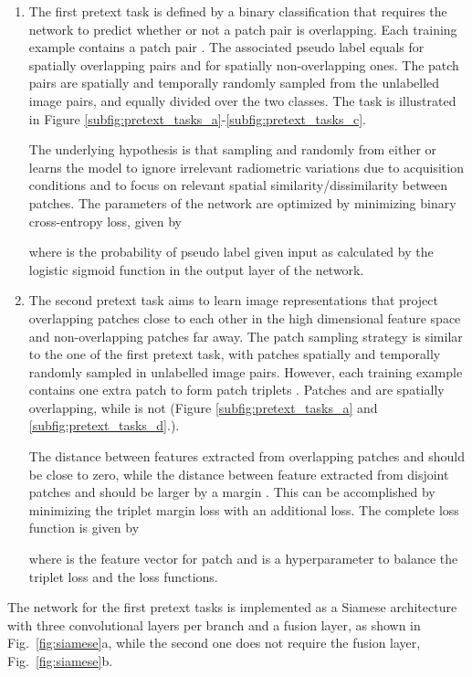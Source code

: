 \documentclass[runningheads]{llncs}
\begin{document}
\begin{enumerate}
\item The first pretext task is defined by a binary classification that requires the network to predict whether or not a patch pair is overlapping. Each training example  contains a patch pair . The associated pseudo label equals  for spatially overlapping pairs and  for spatially non-overlapping ones. The patch pairs are spatially and temporally randomly sampled from the unlabelled image pairs, and equally divided over the two classes. The task is illustrated in Figure \ref{subfig:pretext_tasks_a}-\ref{subfig:pretext_tasks_c}.

The underlying hypothesis is that sampling  and  randomly from either  or  learns the model to ignore irrelevant radiometric variations due to acquisition conditions and to focus on relevant spatial similarity/dissimilarity between patches. 
The parameters of the network are optimized by minimizing binary cross-entropy loss, given by 

where  is the probability of pseudo label  given input  as calculated by the logistic sigmoid function in the output layer of the network. 

\item The second pretext task aims to learn image representations that project overlapping patches close to each other in the high dimensional feature space and non-overlapping patches far away. The patch sampling strategy is similar to the one of the first pretext task, with patches spatially and temporally randomly sampled in unlabelled image pairs. However, each training example  contains one extra patch to form patch triplets . Patches  and  are spatially overlapping, while  is not (Figure \ref{subfig:pretext_tasks_a} and \ref{subfig:pretext_tasks_d}.). 

The distance between features extracted from overlapping patches  and  should be close to zero, while the distance between feature extracted from disjoint patches  and  should be larger by a margin . This can be accomplished by minimizing the triplet margin loss with an additional  loss. The complete loss function is given by

where  is the feature vector for patch  and  is a hyperparameter to balance the triplet loss and the  loss functions. \end{enumerate}

{The network for the first pretext tasks is implemented as a Siamese architecture with three convolutional layers per branch and a fusion layer, as shown in Fig.~\ref{fig:siamese}a, while the second one does not require the fusion layer, Fig.~\ref{fig:siamese}b.}
\end{document}
